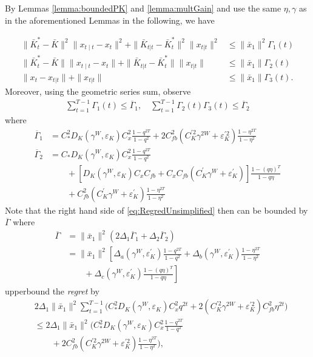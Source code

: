 \documentclass[letterpaper, 10 pt, conference]{ieeeconf}  %
\begin{document}
By Lemmas \ref{lemma:boundedPK} and \ref{lemma:multGain} and use the same $\eta,\gamma$ as in the aforementioned Lemmas in the following, we have 

\begin{align*}
     \|\bar{K}_{t}^{*}-\bar{K}\|^{2}\|x_{t\mid t}-x_{t}\|^{2}  + \|\bar{K}_{t|t}-\bar{K}_{t}^{*}\|^{2} \|x_{t|t}\|^{2} & \leq \|\bar{x}_1\|^2\Gamma_1(t) \\
     \|\bar{K}_{t}^{*}-\bar{K}\|\|x_{t\mid t}-x_{t}\|  + \|\bar{K}_{t|t}-\bar{K}_{t}^{*}\| \|x_{t|t}\| & \leq \|\bar{x}_{1}\| \Gamma_2(t)\\
     \|x_{t}-x_{t|t}\| + \|x_{t|t}\| & \leq \|\bar{x}_{1}\|\Gamma_3(t).
\end{align*}
Moreover, using the geometric series sum, observe
\begin{align*}
   \sum_{t=1}^{T-1} \Gamma_1(t) \leq \overline{\Gamma}_1,\quad
   \sum_{t=1}^{T-1} \Gamma_2(t)\Gamma_3(t) \leq \overline{\Gamma}_2
 \end{align*}
where 
\begin{align*}
    \overline{\Gamma}_1 &= C_{*}^{2}D_{K}(\gamma^{W},\varepsilon_{K})C_{x}^{2}\frac{1-q^{2T}}{1-q^{2}} + 2C_{fb}^{2}(C_{K}^{'2}\gamma^{2W}+\varepsilon_{K}^{'2})\frac{1-\eta^{2T}}{1-\eta^{2}}\\
    \overline{\Gamma}_2 &=C_{*}D_{K}(\gamma^{W},\varepsilon_{K})C_{x}^{2}\frac{1-q^{2T}}{1-q^{2}}\\
    & \qquad +[D_{K}(\gamma^{W},\varepsilon_{K})C_{x}C_{fb}+C_{x}C_{fb}(C_{K}^{'}\gamma^{W}+\varepsilon_{K}^{'})]\frac{1-(q\eta)^{T}}{1-q\eta}\\
    &\qquad + C_{fb}^{2}(C_{K}^{'}\gamma^{W}+\varepsilon_{K}^{'})\frac{1-\eta^{2T}}{1-\eta^{2}} 
\end{align*}
Note that the right hand side of \eqref{eq:RegredUnsimplified} then can be bounded by $\overline{\Gamma}$ where
\begin{align*}
    \overline{\Gamma} &= \|\bar{x}_1\|^2 \left (2\Delta_1 \overline{\Gamma}_1 + \Delta_2 \overline{\Gamma}_2 \right )\\
    &= \|\bar{x}_{1}\|^{2}\left [\Delta_{a}(\gamma^{W},\varepsilon_{K}^{'})\frac{1-q^{2T}}{1-q^{2}} +  \Delta_{b}(\gamma^{W},\varepsilon_{K}^{'})\frac{1-\eta^{2T}}{1-\eta^{2}} \right .\\ 
    & \left . \qquad + \Delta_{c}(\gamma^{W},\varepsilon_{K}^{'})\frac{1-(q\eta)^{T}}{1-q\eta}\right ]
\end{align*}
upperbound the \emph{regret} by
\begin{align*}
   &2\Delta_{1}\|\bar{x}_{1}\|^{2}\sum_{t=1}^{T-1}\bigg(C_{*}^{2}D_{K}(\gamma^{W},\varepsilon_{K})C_{x}^{2}q^{2t} + 2(C_{K}^{'2}\gamma^{2W}+\varepsilon_{K}^{'2})C_{fb}^{2}\eta^{2t}\bigg) \\
   &\leq 2\Delta_{1}\|\bar{x}_{1}\|^{2}\bigg(C_{*}^{2}D_{K}(\gamma^{W},\varepsilon_{K})C_{x}^{2}\frac{1-q^{2T}}{1-q^{2}} \\
   &\qquad + 2C_{fb}^{2}(C_{K}^{'2}\gamma^{2W}+\varepsilon_{K}^{'2})\frac{1-\eta^{2T}}{1-\eta^{2}} \bigg),
\end{align*}
\end{document}
